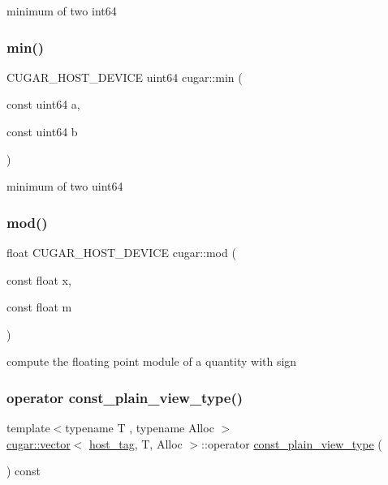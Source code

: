 minimum of two int64 \mbox{\label{group___basic_ga91b60ae04cc513c797e708b451486a12}} 
\subsubsection{\texorpdfstring{min()}{min()}\hspace{0.1cm}{\footnotesize\ttfamily [8/8]}}
{\footnotesize\ttfamily C\+U\+G\+A\+R\+\_\+\+H\+O\+S\+T\+\_\+\+D\+E\+V\+I\+CE uint64 cugar\+::min (\begin{DoxyParamCaption}\item[{const uint64}]{a,  }\item[{const uint64}]{b }\end{DoxyParamCaption})\hspace{0.3cm}{\ttfamily [inline]}}

minimum of two uint64 \mbox{\label{group___basic_gaa6ea8810d6e0f5f42d49be632566378c}} 
\subsubsection{\texorpdfstring{mod()}{mod()}}
{\footnotesize\ttfamily float C\+U\+G\+A\+R\+\_\+\+H\+O\+S\+T\+\_\+\+D\+E\+V\+I\+CE cugar\+::mod (\begin{DoxyParamCaption}\item[{const float}]{x,  }\item[{const float}]{m }\end{DoxyParamCaption})\hspace{0.3cm}{\ttfamily [inline]}}

compute the floating point module of a quantity with sign \mbox{\label{group___basic_ga338f7b6f3de7b1dc36a125fd4704cff8}} 
\subsubsection{\texorpdfstring{operator const\+\_\+plain\+\_\+view\+\_\+type()}{operator const\_plain\_view\_type()}\hspace{0.1cm}{\footnotesize\ttfamily [1/5]}}
{\footnotesize\ttfamily template$<$typename T , typename Alloc $>$ \\
\hyperlink{structcugar_1_1vector}{cugar\+::vector}$<$ \hyperlink{structcugar_1_1host__tag}{host\+\_\+tag}, T, Alloc $>$\+::operator \hyperlink{structcugar_1_1vector__view}{const\+\_\+plain\+\_\+view\+\_\+type} (\begin{DoxyParamCaption}{ }\end{DoxyParamCaption}) const\hspace{0.3cm}{\ttfamily [inline]}}

